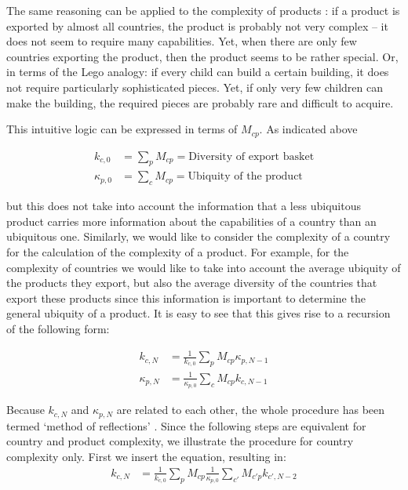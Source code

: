 \documentclass[abstract=on]{scrartcl}
\begin{document}
The same reasoning can be applied to the complexity of products :
if a product is exported by almost all countries, the product is probably not very complex -- it does not seem to require many capabilities. 
Yet, when there are only few countries exporting the product, then the product seems to be rather special.
Or, in terms of the Lego analogy:
if every child can build a certain building, it does not require particularly sophisticated pieces.
Yet, if only very few children can make the building, the required pieces are probably rare and difficult to acquire.

This intuitive logic can be expressed in terms of  $M_{cp}$.
As indicated above

\begin{align}
k_{c,0} &= \sum_pM_{cp} = \text{Diversity of export basket}\\
\kappa_{p,0} &= \sum_cM_{cp} = \text{Ubiquity of the product}
\end{align}

but this does not take into account the information that a less ubiquitous product carries more information about the capabilities of a country than an ubiquitous one.
Similarly, we would like to consider the complexity of a country for the calculation of the complexity of a product.
For example, for the complexity of countries we would like to take into account the average ubiquity of the products they export, but also the average diversity of the countries that export these products since this information is important to determine the general ubiquity of a product.
It is easy to see that this gives rise to a recursion of the following form:

\begin{align}
\label{eq:req-c}
k_{c,N} &= \frac{1}{k_{c,0}} \sum_pM_{cp} \kappa_{p,N-1} \\
\label{eq:req-p}
\kappa_{p,N} &= \frac{1}{\kappa_{p,0}} \sum_cM_{cp} k_{c,N-1}
\end{align}

Because $k_{c,N}$ and $\kappa_{p,N}$ are related to each other, the whole procedure has been termed `method of reflections' \citep{Hausmann:2013vj}.
Since the following steps are equivalent for country and product complexity, we illustrate the procedure for country complexity only.
First we insert the equation, resulting in:
\begin{align}
k_{c,N} &= \frac{1}{k_{c,0}} \sum_pM_{cp} \frac{1}{\kappa_{p,0}} \sum_{c'}M_{c'p} k_{c',N-2} 
\end{align}
\end{document}
